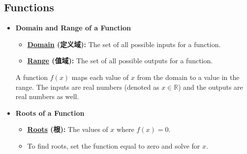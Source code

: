 
\subsection{Functions}
\begin{itemize}
    \item \textbf{Domain and Range of a Function}
    \begin{itemize}
        \item \textbf{\underline{Domain} (定义域):} The set of all possible inputs for a function.
        \item \textbf{\underline{Range} (值域):} The set of all possible outputs for a function.
    \end{itemize}
    A function $f(x)$ maps each value of $x$ from the domain to a value in the range. The inputs are real numbers (denoted as
    $x \in \mathbb{R}$) and the outputs are real numbers as well.
    \item \textbf{Roots of a Function}
    \begin{itemize}
        \item \textbf{\underline{Roots} (根):} The values of $x$ where $f(x) = 0$.
        \item To find roots, set the function equal to zero and solve for $x$.
    \end{itemize}
\end{itemize}